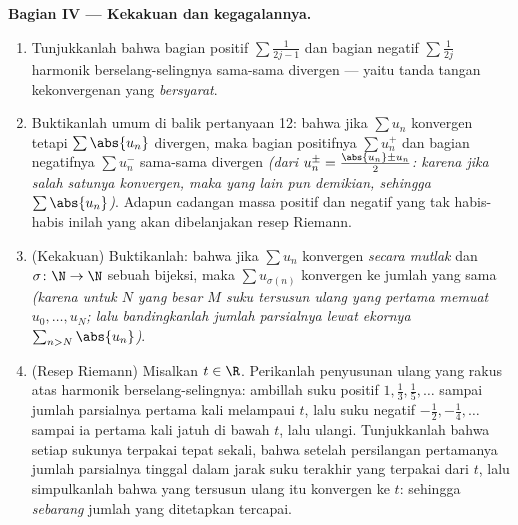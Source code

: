 \begin{problem}[{Soal akhir pekan --- $H_n = \ln n + \gamma +
\frac{1}{2n} + O(n^{-2})$, dan menyusun ulang $1 - \frac12 +
\frac13 - \dots$ menjadi $\frac{\ln 2}{2}$}]
\medskip
\noindent\textbf{Bagian IV --- Kekakuan dan kegagalannya.}
\begin{enumerate}[resume]
  \item Tunjukkanlah bahwa bagian positif $\sum \frac{1}{2j-1}$ dan
        bagian negatif $\sum \frac{1}{2j}$  harmonik
        berselang-selingnya sama-sama divergen --- yaitu tanda tangan
        kekonvergenan yang \emph{bersyarat}.
  \item Buktikanlah  umum di balik pertanyaan 12: bahwa jika
        $\sum u_n$ konvergen tetapi $\sum \abs{u_n}$ divergen, maka
         bagian positifnya $\sum u_n^+$ dan bagian
        negatifnya $\sum u_n^-$ sama-sama divergen \emph{(dari
        $u_n^\pm = \frac{\abs{u_n} \pm u_n}{2}$: karena jika salah satunya
        konvergen, maka yang lain pun demikian, sehingga $\sum\abs{u_n}$)}.
        Adapun cadangan massa positif dan negatif yang tak habis-habis inilah
        yang akan dibelanjakan resep Riemann.
  \item (Kekakuan) Buktikanlah: bahwa jika $\sum u_n$ konvergen
        \emph{secara mutlak} dan $\sigma \colon \N \to \N$ sebuah
        bijeksi, maka $\sum u_{\sigma(n)}$ konvergen ke
        jumlah yang sama \emph{(karena untuk $N$ yang besar $M$ suku tersusun ulang
        yang pertama memuat $u_0, \dots, u_N$; lalu bandingkanlah jumlah parsialnya
        lewat ekornya $\sum_{n > N}\abs{u_n}$)}.
  \item (Resep Riemann) Misalkan $t \in \R$. Perikanlah penyusunan
        ulang yang rakus atas  harmonik berselang-selingnya: ambillah
        suku positif $1, \frac13, \frac15, \dots$ sampai
        jumlah parsialnya pertama kali melampaui $t$, lalu suku negatif
        $-\frac12, -\frac14, \dots$ sampai ia pertama kali jatuh di bawah
        $t$, lalu ulangi. Tunjukkanlah bahwa setiap sukunya terpakai tepat
        sekali, bahwa setelah persilangan pertamanya jumlah parsialnya
        tinggal dalam jarak suku terakhir yang terpakai dari $t$, lalu simpulkanlah bahwa
         yang tersusun ulang itu konvergen ke $t$: sehingga \emph{sebarang}
        jumlah yang ditetapkan tercapai.
\end{enumerate}


\end{problem}
